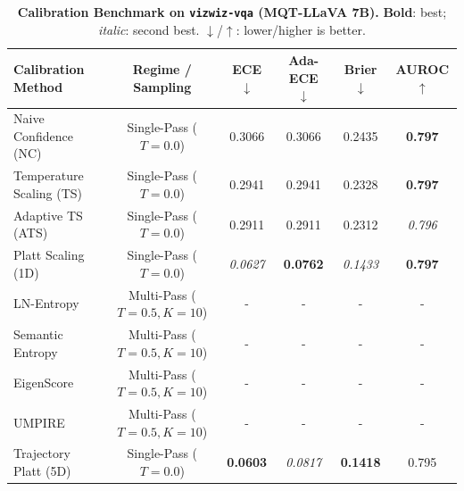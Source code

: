 \begin{table}[t]
\setlength{\tabcolsep}{4pt}
\renewcommand{\arraystretch}{1.05}
\centering
\footnotesize
\begin{tabular}{lccccc}
\toprule
\textbf{Calibration Method} & \textbf{Regime / Sampling} & \textbf{ECE} $\downarrow$ & \textbf{Ada-ECE} $\downarrow$ & \textbf{Brier} $\downarrow$ & \textbf{AUROC} $\uparrow$ \\
\midrule
Naive Confidence (NC) & Single-Pass ($T = 0.0$) & 0.3066 & 0.3066 & 0.2435 & \textbf{0.797} \\
Temperature Scaling (TS) & Single-Pass ($T = 0.0$) & 0.2941 & 0.2941 & 0.2328 & \textbf{0.797} \\
Adaptive TS (ATS) & Single-Pass ($T = 0.0$) & 0.2911 & 0.2911 & 0.2312 & \textit{0.796} \\
Platt Scaling (1D) & Single-Pass ($T = 0.0$) & \textit{0.0627} & \textbf{0.0762} & \textit{0.1433} & \textbf{0.797} \\
LN-Entropy & Multi-Pass ($T = 0.5, K = 10$) & - & - & - & - \\
Semantic Entropy & Multi-Pass ($T = 0.5, K = 10$) & - & - & - & - \\
EigenScore & Multi-Pass ($T = 0.5, K = 10$) & - & - & - & - \\
UMPIRE & Multi-Pass ($T = 0.5, K = 10$) & - & - & - & - \\
Trajectory Platt (5D) & Single-Pass ($T = 0.0$) & \textbf{0.0603} & \textit{0.0817} & \textbf{0.1418} & 0.795 \\
\bottomrule
\end{tabular}
\caption{\textbf{Calibration Benchmark on \texttt{vizwiz-vqa} (MQT-LLaVA 7B).} \textbf{Bold}: best; \textit{italic}: second best. $\downarrow$/$\uparrow$: lower/higher is better.}
\label{tab:benchmark_mqt_vizwizvqa}
\end{table}
